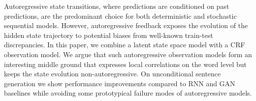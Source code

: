 Autoregressive state transitions, where predictions are conditioned on past predictions, are the predominant choice for both deterministic and stochastic sequential models. However, autoregressive feedback exposes the evolution of the hidden state trajectory to potential biases from well-known train-test discrepancies. In this paper, we combine a latent state space model with a CRF observation model. We argue that such autoregressive observation models form an interesting middle ground that expresses local correlations on the word level but keeps the state evolution non-autoregressive. 
On unconditional sentence generation we show performance improvements compared to  RNN and GAN baselines while avoiding some prototypical failure modes of autoregressive models.